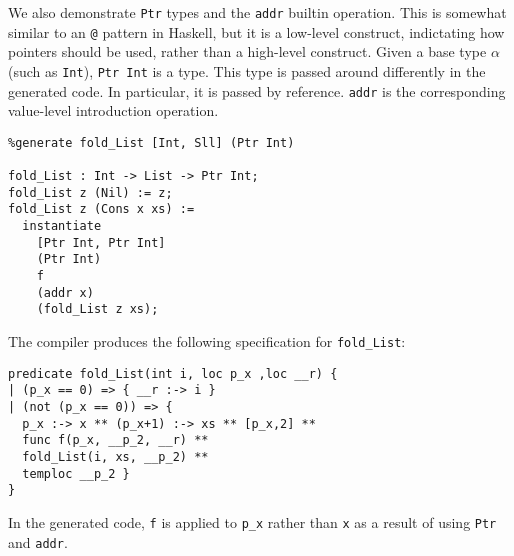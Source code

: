 We also demonstrate \verb|Ptr| types and the \verb|addr| builtin operation. This is somewhat similar to an \verb|@| pattern in Haskell,
but it is a low-level construct, indictating how pointers should be used, rather than a high-level construct.
Given a base type $\alpha$ (such as \verb|Int|), \verb|Ptr Int| is a type. This type is
passed around differently in the generated code. In particular, it is passed by reference.
\verb|addr| is the corresponding value-level introduction operation.
\begin{lstlisting}
%generate fold_List [Int, Sll] (Ptr Int)

fold_List : Int -> List -> Ptr Int;
fold_List z (Nil) := z;
fold_List z (Cons x xs) :=
  instantiate
    [Ptr Int, Ptr Int]
    (Ptr Int)
    f
    (addr x)
    (fold_List z xs);
\end{lstlisting}

\noindent
The compiler produces the following \SuSLik{} specification for \verb|fold_List|:

\begin{lstlisting}
predicate fold_List(int i, loc p_x ,loc __r) {
| (p_x == 0) => { __r :-> i }
| (not (p_x == 0)) => {
  p_x :-> x ** (p_x+1) :-> xs ** [p_x,2] **
  func f(p_x, __p_2, __r) **
  fold_List(i, xs, __p_2) **
  temploc __p_2 }
}
\end{lstlisting}
%
In the generated code, \verb|f| is applied to \verb|p_x| rather than
\verb|x| as a result of using \verb|Ptr| and \verb|addr|.
